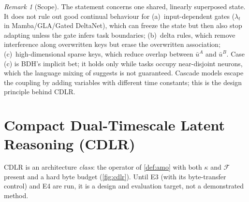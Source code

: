 \documentclass[10pt]{article}
\theoremstyle{remark}
\newtheorem{remark}{Remark}
\newcommand{\cdlr}{\textsc{CDLR}}
\begin{document}
\begin{remark}[Scope]
The statement concerns one shared, linearly superposed state. It does not rule out good continual behaviour for
(a)~input-dependent gates ($\lambda_t$ in Mamba/GLA/Gated DeltaNet), which can freeze the state but then also stop
adapting unless the gate infers task boundaries; (b)~delta rules, which remove interference along overwritten keys
but erase the overwritten association; (c)~high-dimensional sparse keys, which reduce overlap between $\bar u^A$ and
$\bar u^B$. Case (c) is BDH's implicit bet; it holds only while tasks occupy near-disjoint neurons, which the
language mixing of \citet[\S7.1]{kosowski2025bdh} suggests is not guaranteed. Cascade models
\citep{fusi2005cascade,benna2016consolidation} escape the coupling by adding variables with different time
constants; this is the design principle behind \cdlr.
\end{remark}

\section{Compact Dual-Timescale Latent Reasoning (\cdlr)}
\label{sec:method}

\cdlr{} is an architecture \emph{class}: the operator of \cref{def:amo} with both $\kappa$ and $\mathcal{F}$ present
and a hard byte budget (\cref{fig:cdlr}). Until E3 (with its byte-transfer control) and E4 are run, it is a design
and evaluation target, not a demonstrated method.
\end{document}
